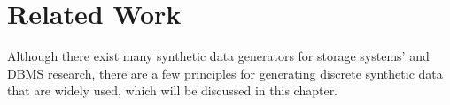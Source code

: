 \chapter{Related Work}\label{chapter:related_work}
Although there exist many synthetic data generators for storage systems' and \ac{DBMS} research, there are a few principles for generating discrete synthetic data that are widely used,
which will be discussed in this chapter. 

